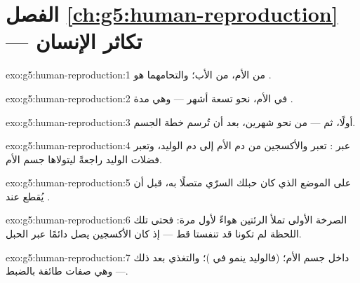 \section*{الفصل \ref{ch:g5:human-reproduction} --- تكاثر الإنسان}

\begin{solution}{exo:g5:human-reproduction:1}
 من الأم،  من الأب؛ والتحامهما هو .
\end{solution}

\begin{solution}{exo:g5:human-reproduction:2}
في  الأم، نحو تسعة أشهر --- وهي مدة .
\end{solution}

\begin{solution}{exo:g5:human-reproduction:3}
 أولًا، ثم  --- من نحو شهرين، بعد أن تُرسم خطة الجسم.
\end{solution}

\begin{solution}{exo:g5:human-reproduction:4}
عبر : تعبر  والأكسجين من دم الأم إلى دم
الوليد، وتعبر فضلات الوليد راجعةً ليتولاها جسم الأم.
\end{solution}

\begin{solution}{exo:g5:human-reproduction:5}
على الموضع الذي كان حبلك السرّي متصلًا به، قبل أن يُقطع عند
.
\end{solution}

\begin{solution}{exo:g5:human-reproduction:6}
الصرخة الأولى تملأ الرئتين هواءً لأول مرة: فحتى تلك اللحظة لم
تكونا قد تنفستا قط --- إذ كان الأكسجين يصل دائمًا عبر الحبل.
\end{solution}

\begin{solution}{exo:g5:human-reproduction:7}
 داخل جسم الأم؛  (فالوليد ينمو في  )؛ والتغذي  بعد ذلك --- وهي صفات طائفة 
بالضبط.
\end{solution}

